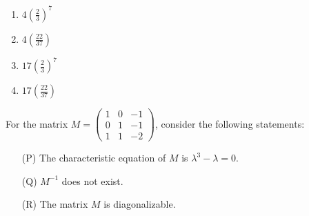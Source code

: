     \begin{multicols}{4}
    \begin{enumerate}
        \item \( 4 \left( \frac{2}{3} \right)^7 \)
        \item \( 4 \left( \frac{22}{37} \right) \)
        \item \( 17 \left( \frac{2}{3} \right)^7 \)
        \item \( 17 \left( \frac{22}{37} \right) \)
    \end{enumerate}
    \end{multicols}
\bigskip
    \item For the matrix \( M = \begin{pmatrix} 1 & 0 & -1 \\ 0 & 1 & -1 \\ 1 & 1 & -2 \end{pmatrix} \), consider the following statements:
    
    \begin{itemize}
        \item[(P)] The characteristic equation of \( M \) is \( \lambda^3 - \lambda = 0 \).
        \item[(Q)] \( M^{-1} \) does not exist.
        \item[(R)] The matrix \( M \) is diagonalizable.
    \end{itemize}


